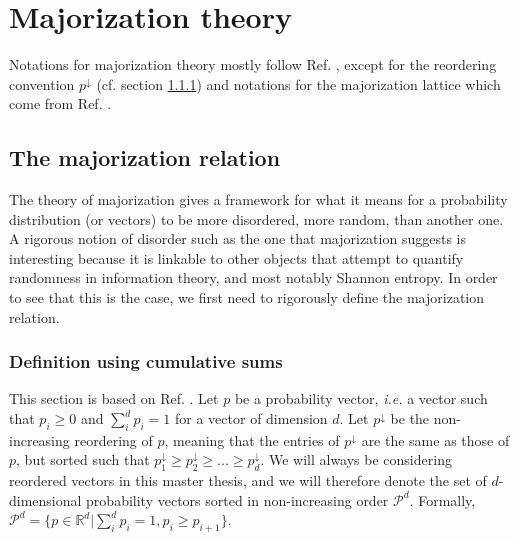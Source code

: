 \chapter{Majorization theory} \label{chap:majorization}

Notations for majorization theory mostly follow Ref. \cite{marshall_inequalities_2011}, except for the reordering convention $p^\downarrow$ (cf. section \ref{sec:cumulative}) and notations for the majorization lattice which come from Ref. \cite{cicalese_supermodularity_2002}.



\section{The majorization relation} \label{sec:majorization}

The theory of majorization gives a framework for what it means for a probability distribution (or vectors) to be more disordered, more random, than another one. A rigorous notion of disorder such as the one that majorization suggests is interesting because it is linkable to other objects that attempt to quantify randomness in information theory, and most notably Shannon entropy. In order to see that this is the case, we first need to rigorously define the majorization relation.



\subsection{Definition using cumulative sums} \label{sec:cumulative}

This section is based on Ref. \cite[pp. 4-10]{marshall_inequalities_2011}. Let $p$ be a probability vector, \textit{i.e.} a vector such that $p_i \geq 0$ and $\sum_{i}^{d} p_i = 1$ for a vector of dimension $d$. Let $p^\downarrow$ be the non-increasing reordering of $p$, meaning that the entries of $p^\downarrow$ are the same as those of $p$, but sorted such that $p^\downarrow_1 \geq p^\downarrow_2 \geq ... \geq p^\downarrow_d$. We will always be considering reordered vectors in this master thesis, and we will therefore denote the set of $d$-dimensional probability vectors sorted in non-increasing order $\mathcal{P}^d$. Formally, $\mathcal{P}^d = \{p \in \mathbb{R}^d | \sum_{i}^{d} p_i = 1, p_i \geq p_{i+1}\}$.

